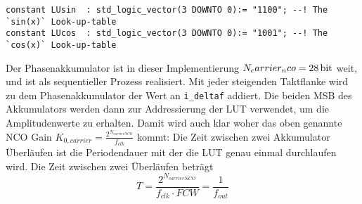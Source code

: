 \begin{lstlisting}
constant LUsin 	: std_logic_vector(3 DOWNTO 0):= "1100"; --! The `sin(x)` Look-up-table
constant LUcos 	: std_logic_vector(3 DOWNTO 0):= "1001"; --! The `cos(x)` Look-up-table
\end{lstlisting}

Der Phasenakkumulator ist in dieser Implementierung $N_carrier_nco=\SI{28}{\bit}$ weit, und ist als sequentieller Prozess realisiert. Mit jeder steigenden Taktflanke wird zu dem Phasenakkumulator der Wert an \lstinline$i_deltaf$ addiert. Die beiden MSB des Akkumulators werden dann zur Addressierung der \gls{LUT} verwendet, um die Amplitudenwerte zu erhalten. Damit wird auch klar woher das oben genannte NCO Gain $K_{0,carrier}=\frac{2^{N_{carrierNCO}}}{f_{clk}}$ kommt: Die Zeit zwischen zwei Akkumulator Überläufen ist die Periodendauer mit der die \gls{LUT} genau einmal durchlaufen wird. Die Zeit zwischen zwei Überläufen beträgt
\begin{equation}
    T=\frac{2^{N_{carrierNCO}}}{f_{clk}\cdot FCW}=\frac{1}{f_{out}}
\end{equation}


